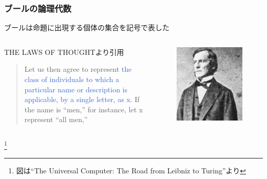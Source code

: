 \documentclass[unicode, 14pt, aspectratio=169]{beamer}
\newcommand\blfootnote[1]{%
  \begingroup
  \renewcommand\thefootnote{}\footnote{#1}%
  \addtocounter{footnote}{-1}%
  \endgroup
}
\begin{document}
\begin{frame}
  \frametitle{ブールの論理代数}
  {\large ブールは命題に出現する個体の集合を記号で表した}
  \begin{columns}
    \begin{column}{0.7\textwidth}
      \begin{center}
        THE LAWS OF THOUGHT\supercite{bool}より引用
        \begin{quotation}
          Let us then agree to represent \textcolor{highlight}{the class of individuals to which a particular name or description is applicable, by a single letter, as x}. If the name is “men,” for instance, let x represent “all men,”
        \end{quotation}
      \end{center}
    \end{column}    
    \begin{column}{0.2\textwidth}
      \begin{figure}
        \includegraphics[width=1\textwidth]{images/bool.png}
      \end{figure}       
    \end{column} 
  \end{columns}
  \blfootnote{図は``The Universal Computer: The Road from Leibniz to Turing''より}
\end{frame}
\end{document}
